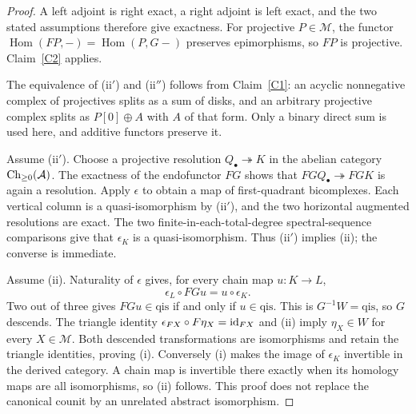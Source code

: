 \begin{proof}
A left adjoint is right exact, a right adjoint is left exact, and the two stated assumptions therefore give exactness. For projective $P\in\mathcal M$, the functor $\operatorname{Hom}(FP,-)=\operatorname{Hom}(P,G-)$ preserves epimorphisms, so $FP$ is projective. Claim~\ref{C2} applies.

The equivalence of (ii$'$) and (ii$''$) follows from Claim~\ref{C1}: an acyclic nonnegative complex of projectives splits as a sum of disks, and an arbitrary projective complex splits as $P[0]\oplus A$ with $A$ of that form. Only a binary direct sum is used here, and additive functors preserve it.

Assume (ii$'$). Choose a projective resolution $Q_\bullet\twoheadrightarrow K$ in the abelian category $\operatorname{Ch}_{\geq0}(\mathcal A)$. The exactness of the endofunctor $FG$ shows that $FGQ_\bullet\twoheadrightarrow FGK$ is again a resolution. Apply $\epsilon$ to obtain a map of first-quadrant bicomplexes. Each vertical column is a quasi-isomorphism by (ii$'$), and the two horizontal augmented resolutions are exact. The two finite-in-each-total-degree spectral-sequence comparisons give that $\epsilon_K$ is a quasi-isomorphism. Thus (ii$'$) implies (ii); the converse is immediate.

Assume (ii). Naturality of $\epsilon$ gives, for every chain map $u:K\to L$,
\[
 \epsilon_L\circ FGu=u\circ\epsilon_K.
\]
Two out of three gives $FGu\in\mathrm{qis}$ if and only if $u\in\mathrm{qis}$. This is $G^{-1}W=\mathrm{qis}$, so $G$ descends. The triangle identity $\epsilon_{FX}\circ F\eta_X=\operatorname{id}_{FX}$ and (ii) imply $\eta_X\in W$ for every $X\in\mathcal M$. Both descended transformations are isomorphisms and retain the triangle identities, proving (i). Conversely (i) makes the image of $\epsilon_K$ invertible in the derived category. A chain map is invertible there exactly when its homology maps are all isomorphisms, so (ii) follows. This proof does not replace the canonical counit by an unrelated abstract isomorphism.
\end{proof}

